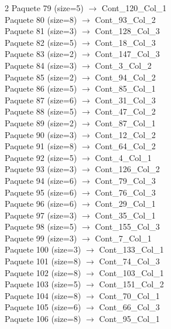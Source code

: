 \begin{multicols}{2}
Paquete 79 (size=5) $\rightarrow$ Cont\_120\_Col\_1\\
Paquete 80 (size=8) $\rightarrow$ Cont\_93\_Col\_2\\
Paquete 81 (size=3) $\rightarrow$ Cont\_128\_Col\_3\\
Paquete 82 (size=5) $\rightarrow$ Cont\_18\_Col\_3\\
Paquete 83 (size=2) $\rightarrow$ Cont\_147\_Col\_3\\
Paquete 84 (size=3) $\rightarrow$ Cont\_3\_Col\_2\\
Paquete 85 (size=2) $\rightarrow$ Cont\_94\_Col\_2\\
Paquete 86 (size=5) $\rightarrow$ Cont\_85\_Col\_1\\
Paquete 87 (size=6) $\rightarrow$ Cont\_31\_Col\_3\\
Paquete 88 (size=5) $\rightarrow$ Cont\_47\_Col\_2\\
Paquete 89 (size=2) $\rightarrow$ Cont\_87\_Col\_1\\
Paquete 90 (size=3) $\rightarrow$ Cont\_12\_Col\_2\\
Paquete 91 (size=8) $\rightarrow$ Cont\_64\_Col\_2\\
Paquete 92 (size=5) $\rightarrow$ Cont\_4\_Col\_1\\
Paquete 93 (size=3) $\rightarrow$ Cont\_126\_Col\_2\\
Paquete 94 (size=6) $\rightarrow$ Cont\_79\_Col\_3\\
Paquete 95 (size=6) $\rightarrow$ Cont\_76\_Col\_3\\
Paquete 96 (size=6) $\rightarrow$ Cont\_29\_Col\_1\\
Paquete 97 (size=3) $\rightarrow$ Cont\_35\_Col\_1\\
Paquete 98 (size=5) $\rightarrow$ Cont\_155\_Col\_3\\
Paquete 99 (size=3) $\rightarrow$ Cont\_7\_Col\_1\\
Paquete 100 (size=3) $\rightarrow$ Cont\_133\_Col\_1\\
Paquete 101 (size=8) $\rightarrow$ Cont\_74\_Col\_3\\
Paquete 102 (size=8) $\rightarrow$ Cont\_103\_Col\_1\\
Paquete 103 (size=5) $\rightarrow$ Cont\_151\_Col\_2\\
Paquete 104 (size=8) $\rightarrow$ Cont\_70\_Col\_1\\
Paquete 105 (size=6) $\rightarrow$ Cont\_66\_Col\_3\\
Paquete 106 (size=8) $\rightarrow$ Cont\_95\_Col\_1\\

\end{multicols}
